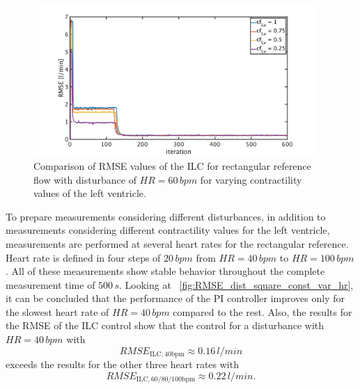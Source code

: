 \begin{figure}[ht!]
  \centering
  \includegraphics[width=0.95\textwidth]{images/chapt_5/ILC/RMSE_dist_square_60_var_cf.pdf}
  \caption[RMSE Comparison of ILC for a rectangular reference flow for varying left ventricular contractilities]{Comparison of RMSE values of the ILC for rectangular reference flow with disturbance of $HR=60\,bpm$ for varying contractility values of the left ventricle.}
  \label{fig:RMSE_dist_square_60_var_cf}
\end{figure}
To prepare measurements considering different disturbances, in addition to measurements considering different contractility values for the left ventricle, measurements are performed at several heart rates for the rectangular reference. Heart rate is defined in four steps of $20\,bpm$ from $HR=40\,bpm$ to $HR=100\,bpm$. All of these measurements show stable behavior throughout the complete measurement time of $500\,s$.
Looking at \figurename~\ref{fig:RMSE_dist_square_const_var_hr}, it can be concluded that the performance of the PI controller improves only for the slowest heart rate of $HR=40\,bpm$ compared to the rest. Also, the results for the RMSE of the ILC control show that the control for a disturbance with $HR=40\,bpm$ with
\begin{equation}
  RMSE_{\mathrm{ILC,40bpm}}\approx 0.16\,l/min
\end{equation}
exceeds the results for the other three heart rates with
\begin{equation}
  RMSE_{\mathrm{ILC,60/80/100bpm}}\approx 0.22\,l/min.
\end{equation}
